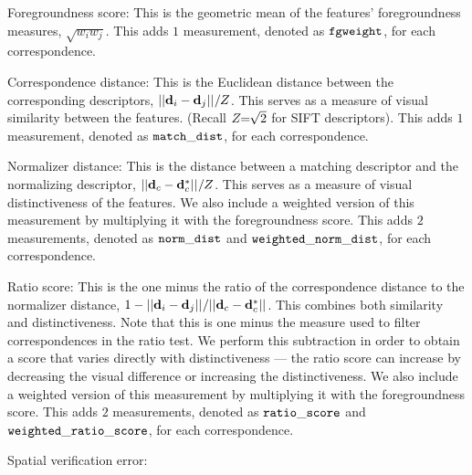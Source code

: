 \begin{itemln}

    \item Foregroundness score:
    This is the geometric mean of the features' foregroundness measures, $\sqrt{w_i w_j}$.
    This adds $1$ measurement, denoted as $\tt{fgweight}$, for each correspondence.

    \item Correspondence distance:
    This is the Euclidean distance between the corresponding descriptors, $||\mathbf{d}_i - \mathbf{d}_j||_{} / Z$.
    This serves as a measure of visual similarity between the features.
    (Recall $Z\mkern-6mu=\mkern-6mu\sqrt{2}$ for SIFT descriptors).
    This adds $1$ measurement, denoted as $\tt{match\_dist}$, for each correspondence.

    \item Normalizer distance:
    This is the distance between a matching descriptor and the normalizing descriptor, %
    $||\mathbf{d}_c - \mathbf{d}^{*}_c||_{} / Z$.
    This serves as a measure of visual distinctiveness of the features.
    We also include a weighted version of this measurement by multiplying it with the foregroundness score.
    This adds $2$ measurements, denoted as $\tt{norm\_dist}$ and $\tt{weighted\_norm\_dist}$, for each
      correspondence.

    \item Ratio score:
    This is the one minus the ratio of the correspondence distance to the normalizer distance, %
    $1 - ||\mathbf{d}_i - \mathbf{d}_j||_{} / ||\mathbf{d}_c - \mathbf{d}^{*}_c||_{}$.
    This combines both similarity and distinctiveness.
    Note that this is one minus the measure used to filter correspondences in the ratio test.
    We perform this subtraction in order to obtain a score that varies directly with distinctiveness --- \ie{}
      the ratio score can increase by decreasing the visual difference or increasing the distinctiveness.
    We also include a weighted version of this measurement by multiplying it with the foregroundness score.
    This adds $2$ measurements, denoted as $\tt{ratio\_score}$ and $\tt{weighted\_ratio\_score}$, for each
      correspondence.
        
    \item Spatial verification error:


\end{itemln}
